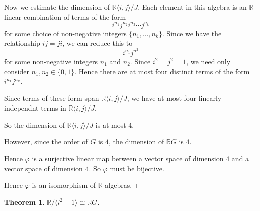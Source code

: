 \documentclass[10pt]{article}
\newtheorem{theorem}{Theorem}
\newenvironment{proof}[1][Proof]{\begin{trivlist}
\item[\hskip \labelsep {\bfseries #1}]}{\end{trivlist}}
\newcommand{\isom}{\cong}
\begin{document}
\begin{proof}
    Now we estimate the dimension of $\mathbb{R}\langle i,j\rangle/J$. Each element
    in this algebra is an $\mathbb{R}$-linear combination
    of terms of the form
    \begin{equation*}
        i^{n_1}j^{n_2}i^{n_3}\cdots j^{n_k}
    \end{equation*}
    for some choice of non-negative integers $\{n_1,\ldots,n_k\}$.
    Since we have the relationship $ij = ji$, we can reduce this to
    \begin{equation*}
        i^{n_1}j^{n^2}
    \end{equation*}
    for some non-negative integers $n_1$ and $n_2$. 
    Since $i^2 = j^2 = 1$, we need only consider $n_1,n_2\in\{0,1\}$.
    Hence there are at most four distinct terms of the form
    $i^{n_1}j^{n_k}$.
    
    Since terms of these form span $\mathbb{R}\langle i,j\rangle/J$,
    we have at most four linearly independnt terms in $\mathbb{R}\langle i,j\rangle/J$.
    
    So the dimension of $\mathbb{R}\langle i,j\rangle/J$ is at most $4$.
    
    However, since the order of $G$ is $4$, the dimension of $\mathbb{R}G$ is $4$.
    
    Hence $\varphi$ is a surjective linear map between a vector space
    of dimension $4$ and a vector space of dimension $4$. So $\varphi$
    must be bijective.
    
    Hence $\varphi$ is an isomorphism of $\mathbb{R}$-algebras. $\Box$
\end{proof} 
\begin{theorem}
    $\mathbb{R}/\langle i^2-1\rangle \isom \mathbb{R}G$.
\end{theorem}
\end{document}
